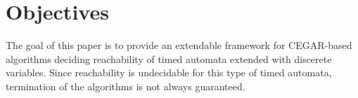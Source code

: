 
\section{Objectives}

The goal of this paper is to provide an extendable framework for CEGAR-based algorithms deciding reachability of timed automata extended with discerete variables. Since reachability is undecidable for this type of timed automata, termination of the algorithms is not always guaranteed.




%
%
%
%
%
%
%
%
%
%


